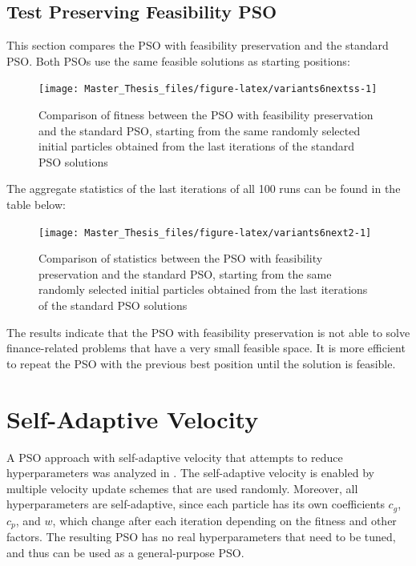 \documentclass[
  oneside, a4paper, 12pt, openany]{book}
\theoremstyle{definition}
\theoremstyle{definition}
\theoremstyle{definition}
\theoremstyle{definition}
\theoremstyle{remark}
\begin{document}
\hypertarget{test-preserving-feasibility-pso}{%
\subsection{Test Preserving Feasibility PSO}\label{test-preserving-feasibility-pso}}

This section compares the PSO with feasibility preservation and the standard PSO. Both PSOs use the same feasible solutions as starting positions:

\begin{figure}[H]
\texttt{[image: Master\_Thesis\_files/figure-latex/variants6nextss-1]} \caption{Comparison of fitness between the PSO with feasibility preservation and the standard PSO, starting from the same randomly selected initial particles obtained from the last iterations of the standard PSO solutions}\label{fig:variants6nextss}
\end{figure}

The aggregate statistics of the last iterations of all 100 runs can be found in the table below:

\begin{figure}[H]
\texttt{[image: Master\_Thesis\_files/figure-latex/variants6next2-1]} \caption{Comparison of statistics between the PSO with feasibility preservation and the standard PSO, starting from the same randomly selected initial particles obtained from the last iterations of the standard PSO solutions}\label{fig:variants6next2}
\end{figure}

The results indicate that the PSO with feasibility preservation is not able to solve finance-related problems that have a very small feasible space. It is more efficient to repeat the PSO with the previous best position until the solution is feasible.

\hypertarget{self-adaptive-velocity}{%
\section{Self-Adaptive Velocity}\label{self-adaptive-velocity}}

A PSO approach with self-adaptive velocity that attempts to reduce hyperparameters was analyzed in \citep{FaYa2014}. The self-adaptive velocity is enabled by multiple velocity update schemes that are used randomly. Moreover, all hyperparameters are self-adaptive, since each particle has its own coefficients \(c_g\), \(c_p\), and \(w\), which change after each iteration depending on the fitness and other factors. The resulting PSO has no real hyperparameters that need to be tuned, and thus can be used as a general-purpose PSO.
\end{document}
